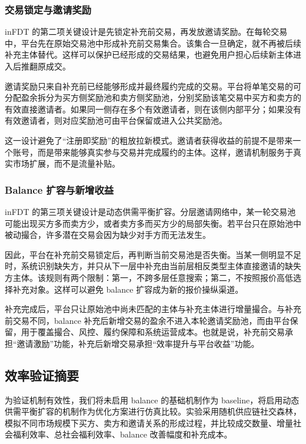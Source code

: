 \documentclass[UTF8,a4paper,12pt]{ctexart}
\begin{document}
\subsubsection{交易锁定与邀请奖励}

inFDT 的第二项关键设计是先锁定补充前交易，再发放邀请奖励。在每轮交易中，平台先在原始交易池中形成补充前交易集合。该集合一旦确定，就不再被后续补充主体替代。这样可以保护已经形成的交易结果，也避免用户担心后续新主体进入后推翻原成交。

邀请奖励只来自补充前已经能够形成并最终履约完成的交易。平台将单笔交易的可分配盈余拆分为买方侧奖励池和卖方侧奖励池，分别奖励该笔交易中买方和卖方的有效直接邀请者。如果同一侧存在多个有效邀请者，则在该侧内部平分；如果没有有效邀请者，则对应奖励池可由平台保留或进入公共奖励池。

这一设计避免了“注册即奖励”的粗放拉新模式。邀请者获得收益的前提不是带来一个账号，而是带来能够真实参与交易并完成履约的主体。这样，邀请机制服务于真实市场扩展，而不是流量补贴。

\subsubsection{Balance 扩容与新增收益}

inFDT 的第三项关键设计是动态供需平衡扩容。分层邀请网络中，某一轮交易池可能出现买方多而卖方少，或者卖方多而买方少的局部失衡。若平台只在原始池中被动撮合，许多潜在交易会因为缺少对手方而无法发生。

因此，平台在补充前交易锁定后，再判断当前交易池是否失衡。当某一侧明显不足时，系统识别缺失方，并只从下一层中补充由当前层相反类型主体直接邀请的缺失方主体。该规则有两个限制：第一，不跨多层任意搜索；第二，不按照报价高低选择补充对象。这样可以避免 balance 扩容成为新的报价操纵渠道。

补充完成后，平台只让原始池中尚未匹配的主体与补充主体进行增量撮合。与补充前交易不同，balance 补充后新增交易的盈余不进入本轮邀请奖励池，而由平台保留，用于覆盖撮合、风控、履约保障和系统运营成本。也就是说，补充前交易承担“邀请激励”功能，补充后新增交易承担“效率提升与平台收益”功能。

\subsection{效率验证摘要}

为验证机制有效性，我们将未启用 balance 的基础机制作为 baseline，将启用动态供需平衡扩容的机制作为优化方案进行仿真比较。实验采用随机供应链社交森林，模拟不同市场规模下买方、卖方和邀请关系的形成过程，并比较成交数量、增量社会福利效率、总社会福利效率、balance 改善幅度和补充成本。
\end{document}
